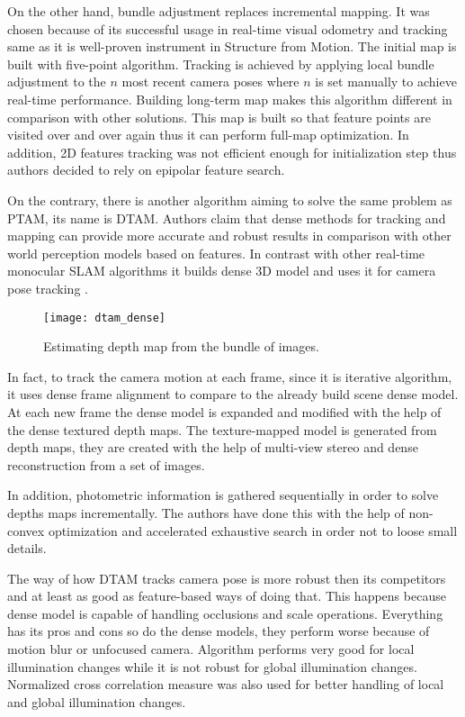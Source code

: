 \documentclass[../../../../main]{subfiles}
\begin{document}
On the other hand, bundle adjustment replaces incremental mapping. It was chosen because of its successful usage in real-time visual odometry and tracking same as it is well-proven instrument in Structure from Motion. The initial map is built with five-point algorithm. Tracking is achieved by applying local bundle adjustment to the $n$ most recent camera poses where $n$ is set manually to achieve real-time performance. Building long-term map makes this algorithm different in comparison with other solutions. This map is built so that feature points are visited over and over again thus it can perform full-map optimization. In addition, 2D features tracking was not efficient enough for initialization step thus authors decided to rely on epipolar feature search.

On the contrary, there is another algorithm aiming to solve the same problem as \ac{PTAM}, its name is \ac{DTAM}. Authors claim that dense methods for tracking and mapping can provide more accurate and robust results in comparison with other world perception models based on features. In contrast with other real-time monocular \ac{SLAM} algorithms it builds dense 3D model and uses it for camera pose tracking \cite{dtam}.


\begin{figure} [ht!]
    \begin{center}
        \texttt{[image: dtam\_dense]}
        \caption{Estimating depth map from the bundle of images.}
        \label{fig:slam}
    \end{center}
\end{figure}

In fact, to track the camera motion at each frame, since it is iterative algorithm, it uses dense frame alignment to compare to the already build scene dense model. At each new frame the dense model is expanded and modified with the help of the dense textured depth maps. The texture-mapped model is generated from depth maps, they are created with the help of multi-view stereo and dense reconstruction from a set of images.

In addition, photometric information is gathered sequentially in order to solve depths maps incrementally. The authors have done this with the help of non-convex optimization and accelerated exhaustive search in order not to loose small details.

The way of how \ac{DTAM} tracks camera pose is more robust then its competitors and at least as good as feature-based ways of doing that. This happens because dense model is capable of handling occlusions and scale operations. Everything has its pros and cons so do the dense models, they perform worse because of motion blur or unfocused camera. Algorithm performs very good for local illumination changes while it is not robust for global illumination changes. Normalized cross correlation measure was also used for better handling of local and global illumination changes.
\end{document}

